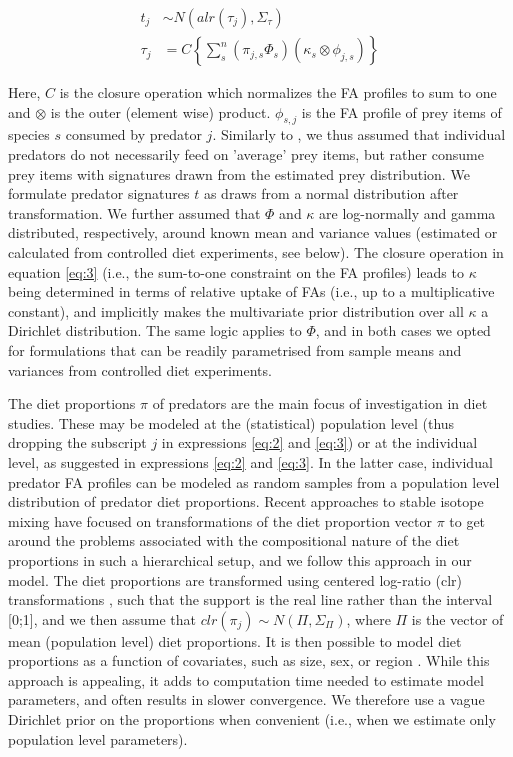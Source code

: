 \documentclass[fleqn,10pt]{wlpeerj}
\begin{document}
\begin{align}
t_j &\sim N(alr(\tau_{j}),\Sigma_{\tau})\label{eq:2}\\
\tau_{j} &= C \left\{ \sum_{s}^n  \left(\pi_{j,s} \Phi_{s} \right) \left(
    \kappa_{s} \otimes \phi_{j,s} \right) \right\}\label{eq:3}
\end{align}

Here, $C$ is the closure operation which normalizes the FA profiles to sum to
one and $\otimes$ is the outer (element wise) product. $\phi_{s,j}$ is
the FA profile of prey items of species $s$ consumed by predator
$j$. Similarly to \citet{parnell_bayesian_2012},
we thus assumed that individual predators do not necessarily feed on
'average' prey items, but rather consume prey items with
signatures drawn from the estimated prey distribution. We
formulate predator signatures $t$ as draws from a normal distribution after
transformation. We further assumed that
$\Phi$ and $\kappa$ are log-normally and gamma
distributed, respectively, around known mean and variance values (estimated or
calculated from controlled diet experiments, see below). The
closure operation in equation \eqref{eq:3} (i.e., the sum-to-one constraint
on the FA profiles) leads to $\kappa$ being determined in terms of
relative uptake of FAs (i.e., up to a multiplicative
constant), and implicitly makes the multivariate prior distribution over all $\kappa$ a Dirichlet
distribution. The same logic applies to $\Phi$, and in both cases we
opted for formulations that can be readily parametrised from sample means and variances from controlled diet experiments.

The diet proportions $\pi$ of predators are the main focus of investigation
in diet studies. These may be modeled at the (statistical) population
level (thus dropping the subscript $j$ in expressions \eqref{eq:2} and \eqref{eq:3}) or at the
individual level, as suggested in expressions \eqref{eq:2} and \eqref{eq:3}. In the latter case,
individual predator FA profiles can be modeled as random samples from a population
level distribution of predator diet proportions. Recent approaches to stable
isotope mixing have focused on transformations of the diet proportion
vector $\pi$ to get around the
problems associated with the compositional nature of the diet
proportions in such a hierarchical setup, and we follow this approach
in our model. The diet proportions are transformed using centered log-ratio (clr)
transformations \citep{semmens_quantifying_2009}, such that the
support is the real line rather than the interval [0;1], and we
then assume that $clr(\pi_j) \sim N(\Pi,\Sigma_{\Pi})$, where $\Pi$ is the
vector of mean (population level) diet proportions. It is
then possible to model diet proportions as a function of
covariates, such as size, sex, or region \citep[i.e., in a regression
formulation,][]{parnell_bayesian_2012}. While this approach is appealing, it adds to computation time needed
to estimate model parameters, and often results in slower convergence. We therefore use a vague Dirichlet prior
on the proportions when convenient (i.e., when we estimate only
population level parameters).
\end{document}
